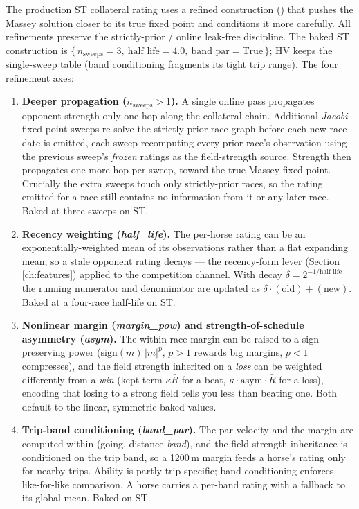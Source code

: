 The production ST collateral rating uses a refined construction ()
that pushes the Massey solution closer to its true fixed point and conditions it more carefully.
All refinements preserve the strictly-prior / online leak-free discipline. The baked ST
construction is $\{\,n_{\text{sweeps}}=3,\ \text{half\_life}=4.0,\ \text{band\_par}=\text{True}\,\}$;
HV keeps the single-sweep table (band conditioning fragments its tight trip range). The four
refinement axes:

\begin{enumerate}[label=\textbf{R\arabic*.},leftmargin=*]
  \item \textbf{Deeper propagation ($n_{\text{sweeps}}>1$).} A single online pass propagates
        opponent strength only one hop along the collateral chain. Additional \emph{Jacobi}
        fixed-point sweeps re-solve the strictly-prior race graph before each new race-date is
        emitted, each sweep recomputing every prior race's observation using the previous sweep's
        \emph{frozen} ratings as the field-strength source. Strength then propagates one more hop
        per sweep, toward the true Massey fixed point. Crucially the extra sweeps touch only
        strictly-prior races, so the rating emitted for a race still contains no information from
        it or any later race. Baked at three sweeps on ST.
  \item \textbf{Recency weighting (\emph{half\_life}).} The per-horse rating can be an
        exponentially-weighted mean of its observations rather than a flat expanding mean, so a
        stale opponent rating decays --- the recency-form lever (Section \ref{ch:features}) applied
        to the competition channel. With decay $\delta = 2^{-1/\text{half\_life}}$ the running
        numerator and denominator are updated as $\delta\cdot(\text{old}) + (\text{new})$. Baked at
        a four-race half-life on ST.
  \item \textbf{Nonlinear margin (\emph{margin\_pow}) and strength-of-schedule asymmetry
        (\emph{asym}).} The within-race margin can be raised to a sign-preserving power
        ($\mathrm{sign}(m)\,|m|^{p}$, $p>1$ rewards big margins, $p<1$ compresses), and the field
        strength inherited on a \emph{loss} can be weighted differently from a \emph{win} (kept
        term $\kappa\bar R$ for a beat, $\kappa\cdot\mathrm{asym}\cdot\bar R$ for a loss), encoding
        that losing to a strong field tells you less than beating one. Both default to the linear,
        symmetric baked values.
  \item \textbf{Trip-band conditioning (\emph{band\_par}).} The par velocity and the margin are
        computed within (going, distance-\emph{band}), and the field-strength inheritance is
        conditioned on the trip band, so a 1200\,m margin feeds a horse's rating only for nearby
        trips. Ability is partly trip-specific; band conditioning enforces like-for-like
        comparison. A horse carries a per-band rating with a fallback to its global mean. Baked on
        ST.
\end{enumerate}

